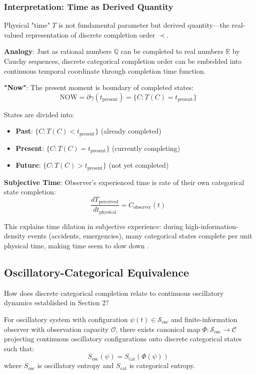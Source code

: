 \documentclass[11pt,onecolumn]{article}
\begin{document}
\subsubsection{Interpretation: Time as Derived Quantity}

Physical "time" $T$ is not fundamental parameter but derived quantity---the real-valued representation of discrete completion order $\prec$.

\textbf{Analogy}: Just as rational numbers $\mathbb{Q}$ can be completed to real numbers $\mathbb{R}$ by Cauchy sequences, discrete categorical completion order can be embedded into continuous temporal coordinate through completion time function.

\textbf{"Now"}: The present moment is boundary of completed states:
\begin{equation}
\text{NOW} = \partial \gamma(t_{\text{present}}) = \{C : T(C) = t_{\text{present}}\}
\end{equation}

States are divided into:
\begin{itemize}
\item \textbf{Past}: $\{C : T(C) < t_{\text{present}}\}$ (already completed)
\item \textbf{Present}: $\{C : T(C) = t_{\text{present}}\}$ (currently completing)
\item \textbf{Future}: $\{C : T(C) > t_{\text{present}}\}$ (not yet completed)
\end{itemize}

\textbf{Subjective Time}: Observer's experienced time is rate of their own categorical state completion:
\begin{equation}
\frac{dT_{\text{perceived}}}{dt_{\text{physical}}} = \dot{C}_{\text{observer}}(t)
\end{equation}

This explains time dilation in subjective experience: during high-information-density events (accidents, emergencies), many categorical states complete per unit physical time, making time seem to slow down \citep{stetson2006time}.

\subsection{Oscillatory-Categorical Equivalence}

How does discrete categorical completion relate to continuous oscillatory dynamics established in Section 2?

\begin{theorem}
\label{thm:osc_cat_equiv}
For oscillatory system with configuration $\psi(t) \in \mathcal{S}_{\text{osc}}$ and finite-information observer with observation capacity $\mathcal{O}$, there exists canonical map $\Phi: \mathcal{S}_{\text{osc}} \to \mathcal{C}$ projecting continuous oscillatory configurations onto discrete categorical states such that:
\begin{equation}
S_{\text{osc}}(\psi) = S_{\text{cat}}(\Phi(\psi))
\end{equation}
where $S_{\text{osc}}$ is oscillatory entropy and $S_{\text{cat}}$ is categorical entropy.
\end{theorem}
\end{document}
